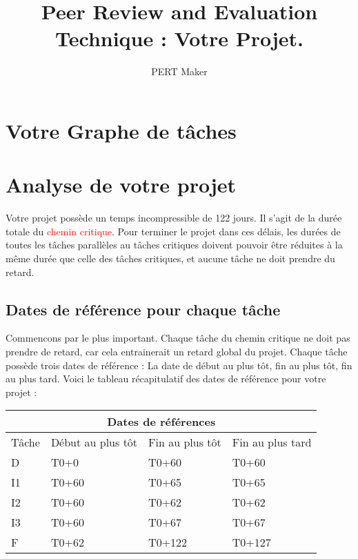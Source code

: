 \documentclass{article}
\title{\centering Peer Review and Evaluation Technique : Votre Projet. 
}
\author{PERT Maker}
\begin{document}
\maketitle
\tableofcontents{}
\section{Votre Graphe de tâches}
\begin{center}
\end{center}
\section{Analyse de votre projet}
Votre projet possède un temps incompressible de 122 jours.
    Il s'agit de la durée totale du \textcolor{red}{chemin critique}.
    Pour terminer le projet dans ces délais, les durées de toutes les tâches parallèles au tâches critiques doivent pouvoir être réduites
    à la même durée que celle des tâches critiques, et aucune tâche ne doit prendre du retard.\subsection{Dates de référence pour chaque tâche}Commencons par le plus important. Chaque tâche du chemin critique ne doit pas prendre de
    retard, car cela entrainerait un retard global du projet.
    Chaque tâche possède trois dates de référence : La date de début au plus tôt,
    fin au plus tôt, fin au plus tard.
    Voici le tableau récapitulatif des dates de référence pour votre projet :\newline 
\begin{tabular}{ |p{3cm}||p{3cm}|p{3cm}|p{3cm}|  }
        \hline
        \multicolumn{4}{|c|}{Dates de références} \\
        \hline 
        Tâche&Début au plus tôt&Fin au plus tôt&Fin au plus tard \\ 
        \hline 
 D&T0+0&T0+60&T0+60 \\ 
 I1&T0+60&T0+65&T0+65 \\ 
 I2&T0+60&T0+62&T0+62 \\ 
 I3&T0+60&T0+67&T0+67 \\ 
 F&T0+62&T0+122&T0+127 \\ 
\hline
    \end{tabular} 
\end{document}
